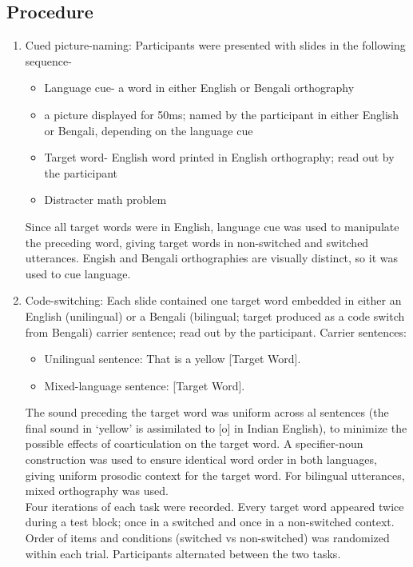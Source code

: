 \documentclass[11pt]{article}
\begin{document}
\subsection{Procedure}
\begin{enumerate}[]
	\item Cued picture-naming: Participants were presented with slides in the following sequence-
	\begin{itemize}
		\item Language cue- a word in either English or Bengali orthography
		\item a picture displayed for 50ms; named by the participant in either English or Bengali, depending on the language cue 
		\item Target word- English word printed in English orthography; read out by the participant
		\item Distracter math problem
	\end{itemize}
Since all target words were in English, language cue was used to manipulate the preceding word, giving target words in non-switched and switched utterances. Engish and Bengali orthographies are visually distinct, so it was used to cue language.
  \item Code-switching: Each slide contained one target word embedded in either an English (unilingual) or a Bengali (bilingual; target produced as a code switch from Bengali) carrier sentence; read out by the participant. Carrier sentences:
  \begin{itemize}
  	\item Unilingual sentence: That is a yellow [Target Word].
  	\item Mixed-language sentence:  [Target Word].
  \end{itemize}
 
  The sound preceding the target word was uniform across al sentences (the final sound in ‘yellow’ is assimilated to [o] in Indian English), to minimize the possible effects of coarticulation on the target word. A specifier-noun construction was used to ensure identical word order in both languages, giving uniform prosodic context for the target word. For bilingual utterances, mixed orthography was used. \\
  Four iterations of each task were recorded. Every target word appeared twice during a test block; once in a switched and once in a non-switched context. Order of items and conditions (switched vs non-switched) was randomized within each trial. Participants alternated between the two tasks.
  
\end{enumerate}
\end{document}
